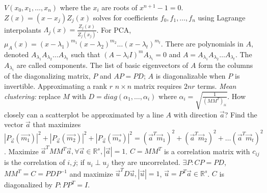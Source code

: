 $V(x_0 , x_1 , \ldots , x_n)$ where the $x_i$ are roots of $x^{n+1}-1=0$.
$Z(x)= (x-x_j) Z_j (x)$ solves for coefficients $f_0 , f_1 , \ldots , f_n$ using
Lagrange interpolants $\Lambda_j(x) = {\frac {Z_j(x)} {Z_j(x_j)}}$.  For PCA,
$\mu_A(x)= 
(x-\lambda_1)^{m_1}
(x-\lambda_2)^{m_2}
\ldots
(x-\lambda_t)^{m_t}
$.  There are polynomials in $A$, denoted $ A_{\lambda_1} A_{\lambda_2} \ldots A_{\lambda_t} $
such that $(A-\lambda_i I)^m A_{\lambda_i} =0$ and
$A= A_{\lambda_1} A_{\lambda_2} \ldots A_{\lambda_t}$.  The $A_{\lambda_i}$ are called components.
The list of basic eigenvectors of $A$ form the columns of the diagonalizing matrix, $P$ and
$AP=PD$; $A$ is diagonalizable when $P$ is invertible.
Approximating a rank $r$ $n \times n$ matrix requires $2nr$ terms.  \emph{Mean clustering:}
replace $M$ with $D= diag(\alpha_1, \ldots, \alpha_i)$ where
$\alpha_i= {\sqrt {\frac 1 {(M M^T)_{ii}}}}$.   How closely can a scatterplot be approximated
by a line $A$ with direction ${\vec a}$?  Find the vector ${\vec a}$ that maximizes
$
|P_{\vec a} ({\vec {m_1}})|^2 +
|P_{\vec a} ({\vec {m_2}})|^2 +
|P_{\vec a} ({\vec {m_s}})|^2 =
({\vec a}^T {\vec m_1})^2 + ({\vec a}^T {\vec m_2})^2 +
\ldots ({\vec a}^T {\vec m_t})^2$.  Maximize ${\vec a}^T M M^T {\vec a},
\forall {\vec a} \in {\mathbb R}^s, |{\vec a}|=1$.  $C=M M^T$ is a correlation matrix
with
$c_{ij}$ is the correlation of $i, j$; if $u_i \perp u_j$ they are uncorrelated.
$\exists P: CP=PD$, $M M^T=C= PDP^{-1}$ and maximize ${\vec u}^T D {\vec u}, |{\vec u}|=1$,
${\vec u}= P^T {\vec a} \in {\mathbb R}^s$.  $C$ is diagonalized by $P: P P^T=I$.
